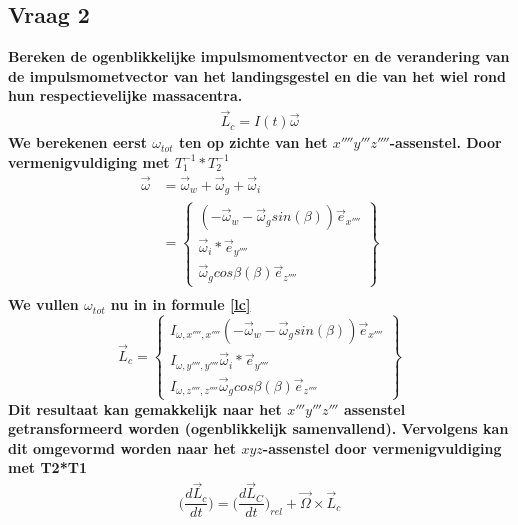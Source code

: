 \documentclass[a4paper,10pt]{article}
\begin{document}
\subsection{Vraag 2}
\textbf{Bereken de ogenblikkelijke impulsmomentvector en de verandering van de impulsmometvector van het landingsgestel en die van het wiel rond hun respectievelijke massacentra.}
\begin{equation}
\label{lc}
\begin{aligned}
	\vec{L}_c = I(t)\vec{\omega}
\end{aligned}
\end{equation}
\textbf{We berekenen eerst $\omega_{tot}$ ten op zichte van het $x''''y'''z''''$-assenstel. Door vermenigvuldiging met $T_1^{-1}*T_2^{-1}$}
\begin{equation}
\begin{aligned}
\vec{\omega} &= \vec{\omega}_w + \vec{\omega}_g + \vec{\omega}_i\\
&= \begin{Bmatrix}
(-\vec{\omega}_w -\vec{\omega}_g sin(\beta))\vec{e}_{x''''}\\
\vec{\omega}_i*\vec{e}_{y''''}\\
\vec{\omega}_g cos{\beta}(\beta)\vec{e}_{z''''}
\end{Bmatrix}\\
\end{aligned}
\end{equation}
\textbf{We vullen $\omega_{tot}$ nu in in formule \eqref{lc} }
\begin{equation}
\vec{L}_c=\begin{Bmatrix}
I_{\omega,x'''',x''''} (-\vec{\omega}_w -\vec{\omega}_g sin(\beta))\vec{e}_{x''''}\\
I_{\omega,y'''',y''''}\vec{\omega}_i*\vec{e}_{y''''}\\
I_{\omega,z'''',z''''}\vec{\omega}_g cos{\beta}(\beta)\vec{e}_{z''''}
\end{Bmatrix}
\end{equation}
\textbf{Dit resultaat kan gemakkelijk naar het $x'''y'''z'''$ assenstel getransformeerd worden (ogenblikkelijk samenvallend). Vervolgens kan dit omgevormd worden naar het $xyz$-assenstel door vermenigvuldiging met T2*T1}
\begin{equation}
\begin{aligned}
\Big(\dfrac{d\vec{L}_c}{dt}\Big) = \Big(\dfrac{d\vec{L}_C}{dt}\Big)_{rel} + \vec{\Omega} \times \vec{L}_c
\end{aligned}
\end{equation}
\end{document}
